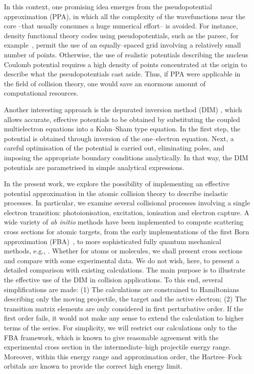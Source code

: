 \documentclass[10pt]{article}
\begin{document}
In this context, one promising idea emerges from the pseudopotential
approximation (PPA), in which all the complexity of the wavefunctions 
near the core --that usually consumes a huge numerical effort-- is 
avoided. For instance, density functional theory codes using 
pseudopotentials, such as the {\sc parsec}, for 
example~\cite{parsecwebpage,Chelikowsky1994}, permit the use of an 
equally--spaced grid involving a relatively small number of points. 
Otherwise, the use of realistic potentials describing the nucleus 
Coulomb potential requires a high density of points concentrated at 
the origin to describe what the pseudopotentials cast aside. Thus, if 
PPA were applicable in the field of collision theory, one would save 
an enormous amount of computational resources.

Another interesting approach is the depurated inversion method 
(DIM) \cite{Mendez2015,Mendez2016,Mendez2018}, which allows accurate, 
effective potentials to be obtained by substituting the coupled 
multielectron equations into a Kohn--Sham type equation. In the first 
step, the potential is obtained through inversion of the 
one--electron equation. Next, a careful optimisation of the potential 
is carried out, eliminating poles, and imposing the appropriate 
boundary conditions analytically. In that way, the DIM potentials are 
parametrised in simple analytical expressions.

In the present work, we explore the possibility of implementing an 
effective potential approximation in the atomic collision theory to 
describe inelastic processes. In particular, we examine several 
collisional processes involving a single electron transition: 
photoionisation, excitation, ionisation and electron capture. 
A wide variety of {\it ab initio} methods have been implemented to
compute scattering cross sections for atomic targets, from the 
early implementations of the first Born approximation 
(FBA)~\cite{Bates1962,McDowell1961}, to more sophisticated fully
quantum mechanical methods, e.g., 
\cite{Pindzola2007,Burke2011,Bray2017,Pindzola2016}. 
Whether for atoms or molecules, we shall present cross sections and 
compare with some experimental data. We do not wish, here, to present 
a detailed comparison with existing calculations. The main 
purpose is to illustrate the effective use of the DIM in collision 
applications. To this end, several simplifications are made: (1) The calculations are constrained to Hamiltonians describing only the 
moving projectile, the target and the active electron; (2) The 
transition matrix elements are only considered in first perturbative 
order. If the first order fails, it would not make any sense to 
extend the calculation to higher terms of the series. For simplicity, 
we will restrict our calculations only to the FBA framework, which is 
known to give reasonable agreement with the experimental cross 
section in the intermediate--high projectile energy range. Moreover, 
within this energy range and approximation order, the Hartree--Fock 
orbitals are known to provide the correct high energy limit.
\end{document}
